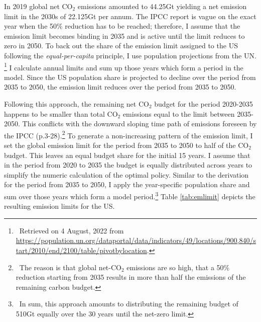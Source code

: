 % 
 In 2019 global net CO$_2$ emissions amounted to 44.25Gt \citep[compare figure SPM1.a p.11 in ][]{IPCCSPM} yielding a net emission limit in the 2030s of 22.125Gt per annum. The IPCC report is vague on the exact year when the 50\% reduction has to be reached; therefore, I assume that the emission limit becomes binding in 2035 and is active until the limit reduces to zero in 2050. 
 To back out the share of the emission limit assigned to the US following the \textit{equal-per-capita} principle, I use population projections from the UN. \footnote{\ Retrieved on 4 August, 2022 from \url{https://population.un.org/dataportal/data/indicators/49/locations/900,840/start/2010/end/2100/table/pivotbylocation}.} 
 I calculate annual limits and sum up those years which form a period in the model.  Since the US population share is projected to decline over the period from 2035 to 2050, the emission limit reduces over the period from 2035 to 2050. 
 
 Following this approach, the remaining net CO$_2$ budget for the period 2020-2035 happens to be smaller than total CO$_2$ emissions equal to the limit between 2035-2050. This conflicts with the downward sloping time path of emissions foreseen by the IPCC (p.3-28).\footnote{\ The reason is that global net-CO$_2$ emissions are so high, that a 50\% reduction starting from 2035 results in more than half the emissions of the remaining carbon budget. }
 To generate a non-increasing pattern of the emission limit, I set the global emission limit for the period from 2035 to 2050 to half of the CO$_2$ budget. This leaves an equal budget share for the initial 15 years. I assume that in the period from 2020 to 2035 the budget is equally distributed across years to simplify the numeric calculation of the optimal policy. Similar to the derivation for the period from 2035 to 2050, I apply the year-specific population share and sum over those years which form a model period.\footnote{\ In sum, this approach amounts to distributing the remaining budget of 510Gt equally over the 30 years until the net-zero limit.} Table \ref{tab:emlimit}  depicts the resulting emission limits for the US.
 
